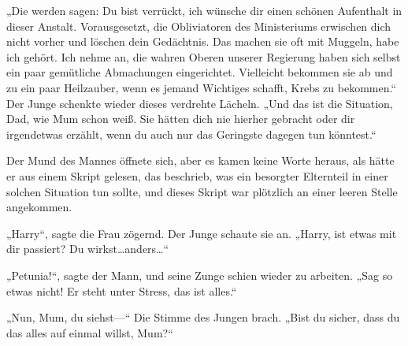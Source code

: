 „Die werden sagen: Du bist verrückt, ich wünsche dir einen schönen Aufenthalt in dieser Anstalt. Vorausgesetzt, die Obliviatoren des Ministeriums erwischen dich nicht vorher und löschen dein Gedächtnis. Das machen sie oft mit Muggeln, habe ich gehört. Ich nehme an, die wahren Oberen unserer Regierung haben sich selbst ein paar gemütliche Abmachungen eingerichtet. Vielleicht bekommen sie ab und zu ein paar Heilzauber, wenn es jemand Wichtiges schafft, Krebs zu bekommen.“
Der Junge schenkte wieder dieses verdrehte Lächeln.
„Und das ist die Situation, Dad, wie Mum schon weiß. Sie hätten dich nie hierher gebracht oder dir irgendetwas erzählt, wenn du auch nur das Geringste dagegen tun könntest.“

Der Mund des Mannes öffnete sich, aber es kamen keine Worte heraus, als hätte er aus einem Skript gelesen, das beschrieb, was ein besorgter Elternteil in einer solchen Situation tun sollte, und dieses Skript war plötzlich an einer leeren Stelle angekommen.



„Harry“, sagte die Frau zögernd. Der Junge schaute sie an. „Harry, ist etwas mit dir passiert? Du wirkst…anders…“

„Petunia!“, sagte der Mann, und seine Zunge schien wieder zu arbeiten. „Sag so etwas nicht! Er steht unter Stress, das ist alles.“

„Nun, Mum, du siehst—“ Die Stimme des Jungen brach. „Bist du sicher, dass du das alles auf einmal willst, Mum?“

